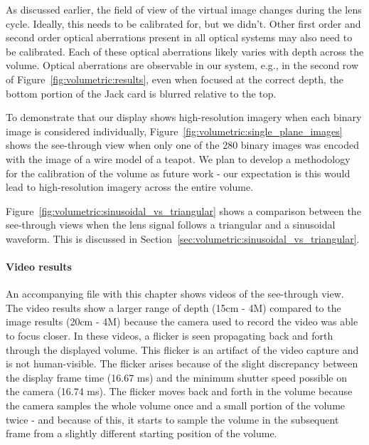 As discussed earlier, the field of view of the virtual image changes during the lens cycle. Ideally, this needs to be calibrated for, but we didn't. Other first order and second order optical aberrations present in all optical systems may also need to be calibrated. Each of these optical aberrations likely varies with depth across the volume. Optical aberrations are observable in our system, e.g., in the second row of Figure~\ref{fig:volumetric:results}, even when focused at the correct depth, the bottom portion of the Jack card is blurred relative to the top. 

To demonstrate that our display shows high-resolution imagery when each binary image is considered individually, Figure~\ref{fig:volumetric:single_plane_images} shows the see-through view when only one of the 280 binary images was encoded with the image of a wire model of a teapot. We plan to develop a methodology for the calibration of the volume as future work - our expectation is this would lead to high-resolution imagery across the entire volume. 

Figure~\ref{fig:volumetric:sinusoidal_vs_triangular} shows a comparison between the see-through views when the lens signal follows a triangular and a sinusoidal waveform. This is discussed in Section~\ref{sec:volumetric:sinusoidal_vs_triangular}.



\paragraph{Video results}
An accompanying file with this chapter shows videos of the see-through view. The video results show a larger range of depth (15cm - 4M) compared to the image results (20cm - 4M) because the camera used to record the video was able to focus closer. In these videos, a flicker is seen propagating back and forth through the displayed volume. This flicker is an artifact of the video capture and is not human-visible. The flicker arises because of the slight discrepancy between the display frame time (16.67 ms) and the minimum shutter speed possible on the camera (16.74 ms). The flicker moves back and forth in the volume because the camera samples the whole volume once and a small portion of the volume twice - and because of this, it starts to sample the volume in the subsequent frame from a slightly different starting position of the volume. 

